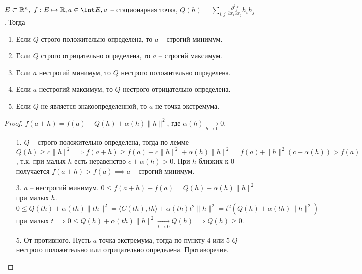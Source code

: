 \begin{theorem} \thmslashn

	$E \subset \mathbb{R} ^ n,\ f : E \mapsto \mathbb{R}, a \in \Int E, a$ -- стационарная точка, $Q(h) = \sum\limits_{i, j}\frac{\partial^2f}{\partial x_i \partial x_j}h_ih_j$. Тогда
	\begin{enumerate}
		\item 
		Если $Q$ строго положительно определена, то $a$ -- строгий минимум.
		\item
		Если $Q$ строго отрицательно определена, то $a$ -- строгий максимум.
		\item
		Если $a$ нестрогий минимум, то $Q$ нестрого положительно определена.
		\item
		Если $a$ нестрогий максимум, то $Q$ нестрого отрицательно определена.
		\item
		Если $Q$ не является знакоопределенной, то $a$ не точка экстремума.
	\end{enumerate}
	\begin{proof} \thmslashn
		
		$f(a + h) = f(a) + Q(h) + \alpha(h)\|h\|^2$, где $\alpha(h) \underset{h \to 0}{\to} 0$.		
		\begin{enumerate}
			
			\item[1.] $Q$ -- строго положительно определена, тогда по лемме $Q(h) \ge c\|h\|^2 \implies f(a + h) \ge f(a) + c\|h\|^2 + \alpha(h)\|h\|^2 = f(a) + \|h\|^2(c + \alpha(h)) > f(a)$, т.к. при малых $h$ есть неравенство $c + \alpha(h) > 0$. При $h$ близких к $0$ получается $f(a + h) > f(a) \implies a$ -- строгий минимум.
			\item[3.]
			$a$ -- нестрогий минимум. $0 \le f(a + h) - f(a) = Q(h) + \alpha(h)\|h\|^2$ при малых $h$. $0 \le Q(th) + \alpha(th)\|th\|^2 = \langle C(th), th \rangle + \alpha(th)t^2\|h\|^2 = t^2(Q(h) + \alpha(th)\|h\|^2)$ при малых $t \implies 0 \le Q(h) + \alpha(th)\|h\|^2 \underset{t \to 0}{\to} Q(h) \implies Q(h) \ge 0$.
			\item[5.]
			От противного. Пусть $a$ точка экстремума, тогда по пункту $4$ или $5$ $Q$ нестрого положительно или отрицательно определена. Противоречие.
		\end{enumerate}
	\end{proof}
\end{theorem}

